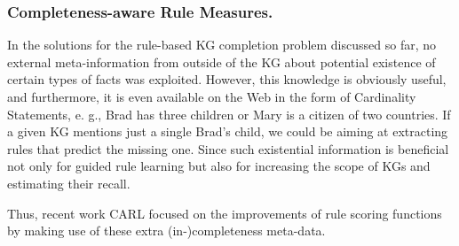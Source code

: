 \subsubsection{Completeness-aware Rule Measures.}  
In the solutions for the rule-based KG completion problem discussed so far, no external meta-information from outside of the KG about potential existence of certain types of facts was exploited. However, this knowledge is obviously useful, and furthermore, it is even available on the Web
in the form of Cardinality Statements, e. g., Brad has three children or Mary is a citizen of two countries. If a given KG mentions just a single Brad’s child, we could be aiming at extracting rules that predict the missing
one. Since such existential information is beneficial not only for guided rule learning but also for increasing the scope of KGs and estimating their recall.

Thus, recent work CARL \cite{carl} focused on the improvements of rule scoring functions by making use of these extra (in-)completeness meta-data.

